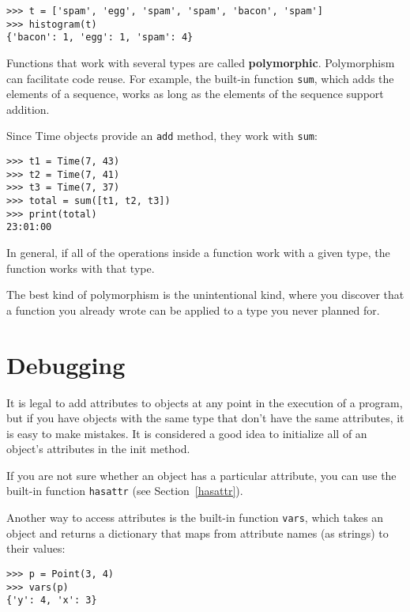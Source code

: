 \begin{lstlisting}
>>> t = ['spam', 'egg', 'spam', 'spam', 'bacon', 'spam']
>>> histogram(t)
{'bacon': 1, 'egg': 1, 'spam': 4}
\end{lstlisting}
%
Functions that work with several types are called {\bf polymorphic}.
Polymorphism can facilitate code reuse.  For example, the built-in
function {\tt sum}, which adds the elements of a sequence, works
as long as the elements of the sequence support addition.

Since Time objects provide an {\tt add} method, they work
with {\tt sum}:

\begin{lstlisting}
>>> t1 = Time(7, 43)
>>> t2 = Time(7, 41)
>>> t3 = Time(7, 37)
>>> total = sum([t1, t2, t3])
>>> print(total)
23:01:00
\end{lstlisting}
%
In general, if all of the operations inside a function
work with a given type, the function works with that type.

The best kind of polymorphism is the unintentional kind, where
you discover that a function you already wrote can be
applied to a type you never planned for.


\section{Debugging}

It is legal to add attributes to objects at any point in the execution
of a program, but if you have objects with the same type that don't
have the same attributes, it is easy to make mistakes.
It is considered a good idea to
initialize all of an object's attributes in the init method.

If you are not sure whether an object has a particular attribute, you
can use the built-in function {\tt hasattr} (see Section~\ref{hasattr}).

Another way to access attributes is the built-in function {\tt vars},
which takes an object and returns a dictionary that maps from
attribute names (as strings) to their values:

\begin{lstlisting}
>>> p = Point(3, 4)
>>> vars(p)
{'y': 4, 'x': 3}
\end{lstlisting}

